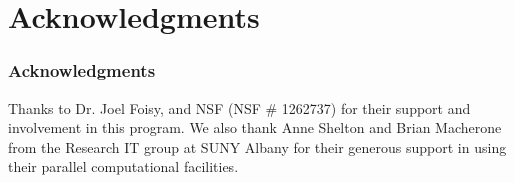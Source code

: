 \documentclass{beamer}   %
\begin{document}
\section{Acknowledgments}

\begin{frame}
  \frametitle{Acknowledgments}
  \vfill
  Thanks to Dr. Joel Foisy, and NSF (NSF \# 1262737) for their
  support and involvement in this program.
  \vfill
  We also thank Anne Shelton and Brian Macherone from the Research IT
  group at SUNY Albany for their generous support in using their
  parallel computational facilities.
  \vfill
\end{frame}
\end{document}
